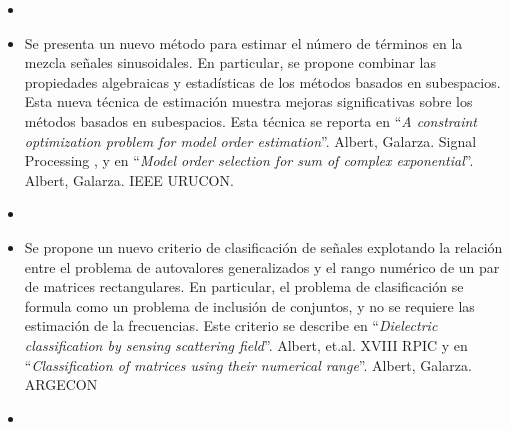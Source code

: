\begin{itemize}
    \item[]
	\item Se presenta un nuevo método para estimar el número de términos en la mezcla señales sinusoidales. En particular, se propone combinar las propiedades algebraicas y estadísticas de los métodos basados en subespacios. Esta nueva técnica de estimación  muestra mejoras significativas sobre los métodos basados en subespacios. Esta técnica  se reporta en ``\textit{A constraint optimization problem for model order estimation}''. Albert, Galarza. Signal Processing \cite{ALBERT2023}, y en ``\textit{Model order selection for sum of complex exponential}''. Albert, Galarza. IEEE URUCON\cite{Albert2021}. 
	\item[]
	\item Se propone un nuevo criterio de clasificación de señales explotando la relación entre el problema de autovalores generalizados y el rango numérico de un par de matrices rectangulares. En particular, el problema de clasificación se formula como un problema de inclusión de conjuntos, y no se requiere las estimación de la frecuencias. Este criterio se describe en ``\textit{Dielectric classification by sensing scattering field}''. Albert, et.al. XVIII RPIC \cite{Albert2017} y en ``\textit{Classification of matrices using their numerical range}''. Albert, Galarza. ARGECON \cite{Albert2018}
	\item[] 
\end{itemize}






